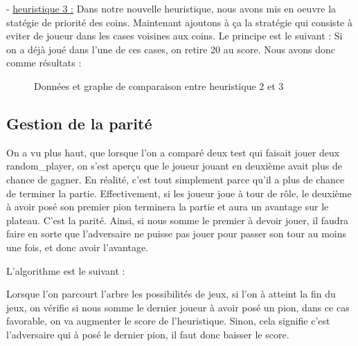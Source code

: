 \documentclass{report}
\begin{document}
- \underline{heuristique 3 :}
Dans notre nouvelle heuristique, nous avons mis en oeuvre la statégie de priorité des coins. Maintenant ajoutons à ça la stratégie qui consiste à eviter de joueur dans les cases voisines aux coins. Le principe est le suivant : Si on a déjà joué dans l'une de ces cases, on retire 20 au score.
\newline
Nous avons donc comme résultats :

\begin{figure}[!h]
\begin{center}
\caption{Données et graphe de comparaison entre heuristique 2 et 3}
\end{center}

\end{figure}


\subsection{Gestion de la parité}

On a vu plus haut, que lorsque l'on a comparé deux test qui faisait jouer deux random\_player, on s'est aperçu que le joueur jouant en deuxième avait plus de chance de gagner. En réalité, c'est tout simplement parce qu'il a plus de chance de terminer la partie. Effectivement, si les joueur joue à tour de rôle, le deuxième à avoir posé son premier pion terminera la partie et aura un avantage sur le plateau. C'est la parité. Ainsi, si nous somme le premier à devoir jouer, il faudra faire en sorte que l'adversaire ne puisse pas jouer pour passer son tour au moins une fois, et donc avoir l'avantage.

L'algorithme est le suivant :

Lorsque l'on parcourt l'arbre les possibilités de jeux, si l'on à atteint la fin du jeux, on vérifie si nous somme le dernier joueur à avoir posé un pion, dans ce cas favorable, on va augmenter le score de l'heuristique. Sinon, cela signifie c'est l'adversaire qui à posé le dernier pion, il faut donc baisser le score.
\end{document}
